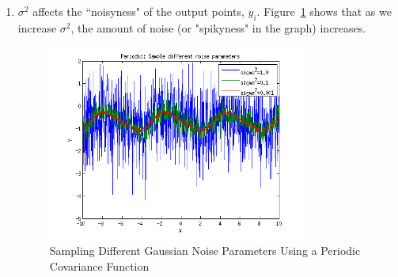 \documentclass{article}
\begin{document}
\begin{enumerate}[label=(\alph*)]
\item $\sigma^2$ affects the ``noisyness" of the output points, $y_i$.
Figure~\ref{fig:1b} shows that as we increase $\sigma^2$, the amount of noise (or "spikyness" in the graph) increases.

\begin{figure}[H]
\centering
\includegraphics[width=0.8\textwidth]{1_b.png}
\caption{Sampling Different Gaussian Noise Parameters Using a Periodic Covariance Function}
\label{fig:1b}
\end{figure}


\end{enumerate}
\end{document}
